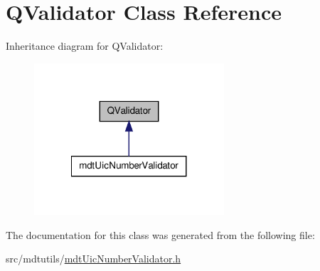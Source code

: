 \hypertarget{class_q_validator}{\section{Q\-Validator Class Reference}
\label{class_q_validator}
}


Inheritance diagram for Q\-Validator\-:
\nopagebreak
\begin{figure}[H]
\begin{center}
\leavevmode
\includegraphics[width=200pt]{class_q_validator__inherit__graph}
\end{center}
\end{figure}


The documentation for this class was generated from the following file\-:\begin{DoxyCompactItemize}
\item 
src/mdtutils/\hyperlink{mdt_uic_number_validator_8h}{mdt\-Uic\-Number\-Validator.\-h}\end{DoxyCompactItemize}
